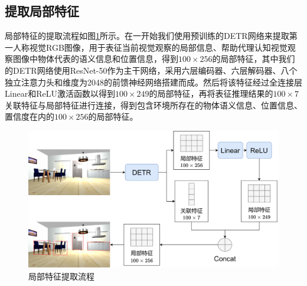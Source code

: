 \subsection{提取局部特征}
局部特征的提取流程如图\ref{局部特征提取}所示。在一开始我们使用预训练的DETR网络来提取第一人称视觉RGB图像，用于表征当前视觉观察的局部信息、帮助代理认知视觉观察图像中物体代表的语义信息和位置信息，得到$100 \times 256$的局部特征，其中我们的DETR网络使用ResNet-50作为主干网络，采用六层编码器、六层解码器、八个独立注意力头和维度为2048的前馈神经网络搭建而成。然后将该特征经过全连接层Linear和ReLU激活函数以得到$100 \times 249$的局部特征，再将表征推理结果的$100 \times 7$关联特征与局部特征进行连接，得到包含环境所存在的物体语义信息、位置信息、置信度在内的$100 \times 256$的局部特征。
\begin{figure}[htbp]
    \centering
    \includegraphics[scale=0.10]{Fig/局部特征提取.png}
    \caption{\label{局部特征提取}局部特征提取流程}
\end{figure}

